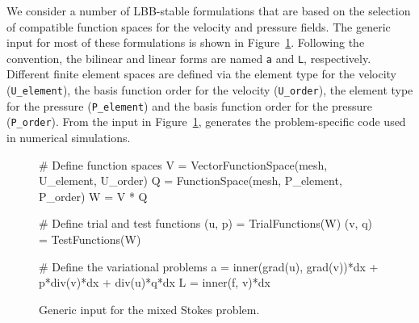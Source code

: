 We consider a number of LBB-stable formulations that are based on the
selection of compatible function spaces for the velocity and pressure
fields. The generic \ufl{} input for most of these formulations is shown
in Figure~\ref{code:terrel:var:mixed}.  Following the \ufl{} convention,
the bilinear and linear forms are named {\tt a} and {\tt L}, respectively.
Different finite element spaces are defined via the element type for the
velocity ({\tt U\_element}), the basis function order for the velocity
({\tt U\_order}), the element type for the pressure ({\tt P\_element})
and the basis function order for the pressure ({\tt P\_order}). From
the input in Figure~\ref{code:terrel:var:mixed}, \ffc{} generates the
problem-specific code used in numerical simulations.
%
\begin{figure}
\begin{python}
# Define function spaces
V = VectorFunctionSpace(mesh, U_element, U_order)
Q = FunctionSpace(mesh, P_element, P_order)
W = V * Q

# Define trial and test functions
(u, p) = TrialFunctions(W)
(v, q) = TestFunctions(W)

# Define the variational problems
a = inner(grad(u), grad(v))*dx + p*div(v)*dx + div(u)*q*dx
L = inner(f, v)*dx
\end{python}
\caption{Generic \ufl{} input for the mixed Stokes problem.}
\label{code:terrel:var:mixed}
\end{figure}

